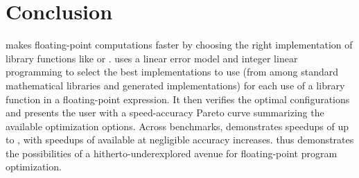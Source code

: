 \documentclass[paper.tex]{subfiles}
\begin{document}
\section{Conclusion}
\label{sec:conclusion}

\name makes floating-point computations faster
  by choosing the right implementation
  of library functions like  or .
\name uses a linear error model
  and integer linear programming
  to select the best implementations to use
  (from among standard mathematical libraries
  and generated implementations)
  for each use of a library function in a floating-point expression.
It then verifies the optimal configurations
  and presents the user with a speed-accuracy Pareto curve
  summarizing the available optimization options.
Across \nBenchmarks benchmarks,
  \name demonstrates speedups of up to \nBenchmarkLargeSpeedup,
  with speedups of \nBenchmarkSafeSpeedup available
  at negligible accuracy increases.
\name thus demonstrates the possibilities
  of a hitherto-underexplored avenue
  for floating-point program optimization.
\end{document}
